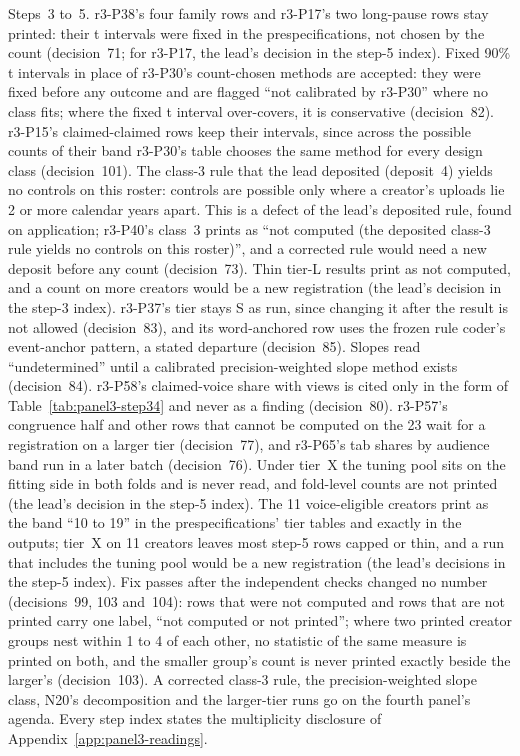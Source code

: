 Steps~3 to~5. r3-P38's four family rows and r3-P17's two long-pause rows stay printed: their t intervals were fixed in
the prespecifications, not chosen by the count (decision~71; for r3-P17, the lead's decision in the step-5 index). Fixed 90\% t intervals in place of r3-P30's
count-chosen methods are accepted: they were fixed before any outcome and are flagged ``not calibrated by r3-P30'' where
no class fits; where the fixed t interval over-covers, it is conservative (decision~82). r3-P15's claimed-claimed rows
keep their intervals, since across the possible counts of their band r3-P30's table chooses the same method for every
design class (decision~101). The class-3 rule that the lead deposited (deposit~4) yields no controls on this roster:
controls are possible only where a creator's uploads lie 2 or more calendar years apart. This is a defect of the lead's
deposited rule, found on application; r3-P40's class~3 prints as ``not computed (the deposited class-3 rule yields no
controls on this roster)'', and a corrected rule would need a new deposit before any count (decision~73). Thin tier-L
results print as not computed, and a count on more creators would be a new registration (the lead's decision in the
step-3 index). r3-P37's tier
stays S as run, since changing it after the result is not allowed (decision~83), and its word-anchored row uses the
frozen rule coder's event-anchor pattern, a stated departure (decision~85). Slopes read ``undetermined'' until a
calibrated precision-weighted slope method exists (decision~84). r3-P58's claimed-voice share with views is cited only in
the form of Table~\ref{tab:panel3-step34} and never as a finding (decision~80). r3-P57's congruence half and other rows
that cannot be computed on the 23 wait for a registration on a larger tier (decision~77), and r3-P65's tab shares by
audience band run in a later batch (decision~76). Under tier~X the tuning pool sits on the fitting side in both folds
and is never read, and fold-level counts are not printed (the lead's decision in the step-5 index). The 11 voice-eligible creators print as the band
``10 to 19'' in the prespecifications' tier tables and exactly in the outputs; tier~X on 11 creators leaves most step-5
rows capped or thin, and a run that includes the tuning pool would be a new registration (the lead's decisions in the
step-5 index).
Fix passes after the independent checks changed no number (decisions~99, 103 and~104): rows that were not computed and
rows that are not printed carry one label, ``not computed or not printed''; where two printed creator groups nest within
1 to 4 of each other, no statistic of the same measure is printed on both, and the smaller group's count is never
printed exactly beside the larger's (decision~103). A corrected class-3 rule, the precision-weighted slope class, N20's
decomposition and the larger-tier runs go on the fourth panel's agenda. Every step index states the multiplicity
disclosure of Appendix~\ref{app:panel3-readings}.


